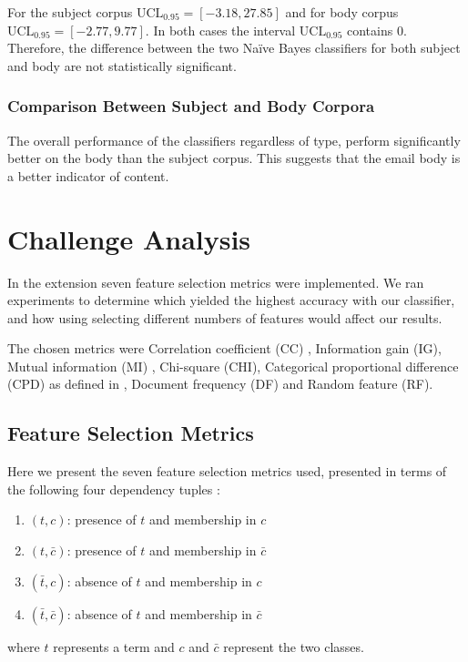 \documentclass[10pt, a4paper]{article}
\begin{document}
For the subject corpus $\text{UCL}_{0.95} = [-3.18, 27.85]$ and for body corpus $\text{UCL}_{0.95} = [-2.77, 9.77]$. In both cases the interval $\text{UCL}_{0.95}$ contains 0. Therefore, the difference between the two Na\"ive Bayes classifiers for both subject and body are not statistically significant.

\subsubsection{Comparison Between Subject and Body Corpora}

The overall performance of the classifiers regardless of type, perform significantly better on the body than the subject corpus. This suggests that the email body is a better indicator of content.

\section{Challenge Analysis}


In the extension seven feature selection metrics were implemented. We ran experiments to determine which yielded the highest accuracy with our classifier, and how using selecting different numbers of features would affect our results.

The chosen metrics were Correlation coefficient (CC) \cite{CC}, Information gain (IG), Mutual information (MI) \cite{IG}, Chi-square (CHI), Categorical proportional difference (CPD) as defined in \cite{CPD}, Document frequency (DF) and Random feature (RF).

\subsection{Feature Selection Metrics}
Here we present the seven feature selection metrics used, presented in terms of the following four dependency tuples \cite{IG}:
\begin{enumerate}
\item $(t,c)$: presence of $t$ and membership in $c$
\item $(t,\bar{c})$: presence of $t$ and membership in $\bar{c}$
\item $(\bar{t},c)$: absence of $t$ and membership in $c$
\item $(\bar{t},\bar{c})$: absence of $t$ and membership in $\bar{c}$
\end{enumerate}
where $t$ represents a term and $c$ and $\bar{c}$ represent the two classes.
\end{document}
